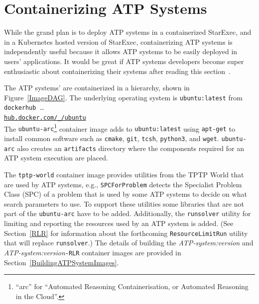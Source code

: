 \documentclass{easychair}
\newcommand{\dav}[1]{{\color{red}{David: {#1}}}}
\begin{document}

\section{Containerizing ATP Systems}
\label{ContainerizingATPSystems}

While the grand plan is to deploy ATP systems in a containerized StarExec, and in a Kubernetes 
hosted version of StarExec, containerizing ATP systems is independently useful because it allows 
ATP systems to be easily deployed in users' applications.
It would be great if ATP systems developers become super enthusiastic about containerizing their 
systems after reading this section~\smiley.

The ATP systems' are containerized in a hierarchy, shown in Figure~\ref{ImageDAG}.
The underlying operating system is {\tt ubuntu:latest} from {\tt dockerhub}~\ldots\\
\hspace*{1cm}\href{https://hub.docker.com/_/ubuntu}{\tt hub.docker.com/\_/ubuntu} \\
The {\tt ubuntu-arc}\footnote{%
``arc'' for ``Automated Reasoning Containerisation, or Automated Reasoning in the Cloud''.}
container image adds to {\tt ubuntu:latest} using {\tt apt-get} to 
install common software such as {\tt cmake}, {\tt git}, {\tt tcsh}, {\tt python3}, and {\tt wget}.
{\tt ubuntu-arc} also creates an {\tt artifacts} directory where the components required for 
an ATP system execution are placed.

The {\tt tptp-world} container image provides utilities from the TPTP World that are used by 
ATP systems, e.g., {\tt SPCForProblem} detects the Specialist Problem Class (SPC) \cite{SS01} of 
a problem that is used by some ATP systems to decide on what search parameters to use.
To support these utilities some libraries that are not part of the {\tt ubuntu-arc} have
to be added.
Additionally, the {\tt runsolver} utility for limiting and reporting the resources used by an 
ATP system is added.
(See Section~\ref{RLR} for information about the forthcoming {\tt ResourceLimitRun} utility
that will replace {\tt runsolver}.)
The details of building the {\em ATP-system:version} and {\em ATP-system:version}{\tt -RLR}
container images are provided in Section~\ref{BuildingATPSystemImages}.
\end{document}

